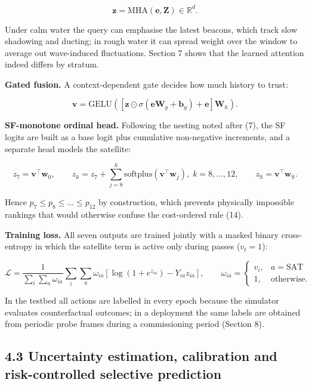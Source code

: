 \documentclass[
  11pt,
]{article}
\begin{document}
\[\mathbf{z}=\mathrm{MHA}(\mathbf{e},\mathbf{Z})\in\mathbb{R}^{d}. \tag{16}\]

Under calm water the query can emphasise the latest beacons, which track
slow shadowing and ducting; in rough water it can spread weight over the
window to average out wave-induced fluctuations. Section 7 shows that
the learned attention indeed differs by stratum.

\textbf{Gated fusion.} A context-dependent gate decides how much history
to trust:

\[\mathbf{v}=\mathrm{GELU}\!\left(\left[\mathbf{z}\odot\sigma(\mathbf{e}\mathbf{W}_g+\mathbf{b}_g)+\mathbf{e}\right]\mathbf{W}_h\right). \tag{17}\]

\textbf{SF-monotone ordinal head.} Following the nesting noted after
(7), the SF logits are built as a base logit plus cumulative
non-negative increments, and a separate head models the satellite:

\[z_{7}=\mathbf{v}^{\top}\mathbf{w}_0,\qquad z_{k}=z_{7}+\sum_{j=8}^{k}\mathrm{softplus}(\mathbf{v}^{\top}\mathbf{w}_j),\;k=8,\dots,12,\qquad z_{\mathrm{S}}=\mathbf{v}^{\top}\mathbf{w}_{\mathrm{S}}. \tag{18}\]

Hence \(p_7\le p_8\le\dots\le p_{12}\) by construction, which prevents
physically impossible rankings that would otherwise confuse the
cost-ordered rule (14).

\textbf{Training loss.} All seven outputs are trained jointly with a
masked binary cross-entropy in which the satellite term is active only
during passes (\(v_t=1\)):

\[\mathcal{L}=\frac{1}{\sum_i\sum_a\omega_{ia}}\sum_i\sum_{a}\omega_{ia}\left[\log(1+e^{z_{ia}})-Y_{ia}z_{ia}\right],\qquad \omega_{ia}=\begin{cases}v_{i},&a=\mathrm{SAT}\\1,&\text{otherwise.}\end{cases} \tag{19}\]

In the testbed all actions are labelled in every epoch because the
simulator evaluates counterfactual outcomes; in a deployment the same
labels are obtained from periodic probe frames during a commissioning
period (Section 8).

\hypertarget{uncertainty-estimation-calibration-and-risk-controlled-selective-prediction}{%
\subsection{4.3 Uncertainty estimation, calibration and risk-controlled
selective
prediction}\label{uncertainty-estimation-calibration-and-risk-controlled-selective-prediction}}
\end{document}
